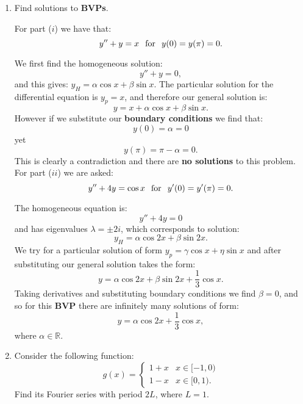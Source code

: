 \pagestyle{fancy}
\fancyhead{}

\begin{enumerate}
    \item Find solutions to \textbf{BVPs}.

    For part ($i$) we have that:
    $$y''+y=x\hspace{0.1in}\text{for}\hspace{0.1in}y(0)=y(\pi)=0.$$
    
    We first find the homogeneous solution:
    $$y''+y=0,$$
    and this gives:
    $y_H=\alpha\cos x+\beta\sin x$. The particular solution for the differential equation is $y_p=x$, and therefore our general solution is:
    $$y=x+\alpha\cos x+\beta\sin x.$$
    However if we substitute our \textbf{boundary conditions} we find that:
    $$y(0)=\alpha=0$$
    yet
    $$y(\pi)=\pi-\alpha=0.$$
    This is clearly a contradiction and there are \textbf{no solutions} to this problem. \\

    For part ($ii$) we are asked:
    $$y''+4y=\cos x\hspace{0.1in}\text{for}\hspace{0.1in}y'(0)=y'(\pi)=0.$$

    The homogeneous equation is:
    $$y''+4y=0$$
    and has eigenvalues $\lambda=\pm 2i$, which corresponds to solution:
    $$y_H=\alpha\cos 2x+\beta\sin 2x.$$
    We try for a particular solution of form $y_p=\gamma\cos x+\eta\sin x$ and after substituting our general solution takes the form:
    $$y=\alpha\cos 2x+\beta\sin 2x+\frac{1}{3}\cos x.$$
    Taking derivatives and substituting boundary conditions we find $\beta=0$,
    and so for this \textbf{BVP} there are infinitely many solutions of form:
    $$y=\alpha\cos 2x+\frac{1}{3}\cos x,$$
    where $\alpha\in\mathbb{R}$.

    \newpage

    \item Consider the following function:
    $$g(x)=
    \left\{
    \begin{array}{ll}
        1+x  & \mbox{} x\in[-1,0) \\
        1-x & \mbox{} x\in[0,1).
    \end{array}
    \right.$$
    Find its Fourier series with period $2L$, where $L=1$. \\


\end{enumerate}
